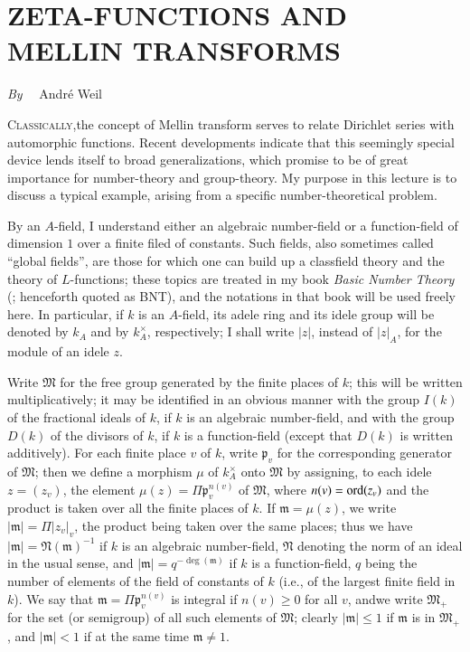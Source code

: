 \chapter[\textsc{A. Weil~:} Zeta-Functions and Mellin Transforms]{ZETA-FUNCTIONS AND MELLIN TRANSFORMS}\label{art21}

\begin{center}
{\em By}~~ Andr\'e Weil
\end{center}

\setcounter{pageoriginal}{408}
\textsc{Classically,}\pageoriginale the concept of Mellin transform serves to relate Dirichlet series with automorphic functions. Recent developments indicate that this seemingly special device lends itself to broad generalizations, which promise to be of great importance for number-theory and group-theory. My purpose in this lecture is to discuss a typical example, arising from a specific number-theoretical problem.

By an $A$-field, I understand either an algebraic number-field or a function-field of dimension $1$ over a finite filed of constants. Such fields, also sometimes called ``global fields'', are those for which one can build up a classfield theory and the theory of $L$-functions; these topics are treated in my book {\em Basic Number Theory} (\cite{art21-key3}; henceforth quoted as BNT), and the notations in that book will be used freely here. In particular, if $k$ is an $A$-field, its adele ring and its idele group will be denoted by $k_{A}$ and by $k^{\times}_{A}$, respectively; I shall write $|z|$, instead of $|z|_{A}$, for the module of an idele $z$.

Write $\mathfrak{M}$ for the free group generated by the finite places of $k$; this will be written multiplicatively; it may be identified in an obvious manner with the group $I(k)$ of the fractional ideals of $k$, if $k$ is an algebraic number-field, and with the group $D(k)$ of the divisors of $k$, if $k$ is a function-field (except that $D(k)$ is written additively). For each finite place $v$ of $k$, write $\mathfrak{p}_{v}$ for the corresponding generator of $\mathfrak{M}$; then we define a morphism $\mu$ of $k^{\times}_{A}$ onto $\mathfrak{M}$ by assigning, to each idele $z=(z_{v})$, the element $\mu(z)=\Pi \mathfrak{p}^{n(v)}_{v}$ of $\mathfrak{M}$, where $n(v)=\operatorname{\mathrm{ord}} (z_{v})$ and the product is taken over all the finite places of $k$. If $\mathfrak{m}=\mu(z)$, we write $|\mathfrak{m}|=\Pi |z_{v}|_{v}$, the product being taken over the same places; thus we have $|\mathfrak{m}|=\mathfrak{N}(\mathfrak{m})^{-1}$ if $k$ is an algebraic number-field, $\mathfrak{N}$ denoting the norm of an ideal in the usual sense, and $|\mathfrak{m}|=q^{-\deg(\mathfrak{m})}$ if $k$ is a function-field, $q$ being the number of elements of the field of constants of $k$ (i.e., of the largest finite field in $k$). We say that $\mathfrak{m}=\Pi \mathfrak{p}^{n(v)}_{v}$ is integral if $n(v)\geq 0$ for all $v$, and\pageoriginale we write $\mathfrak{M}_{+}$ for the set (or semigroup) of all such elements of $\mathfrak{M}$; clearly $|\mathfrak{m}|\leq 1$ if $\mathfrak{m}$ is in $\mathfrak{M}_{+}$, and $|\mathfrak{m}|<1$ if at the same time $\mathfrak{m}\neq 1$.

